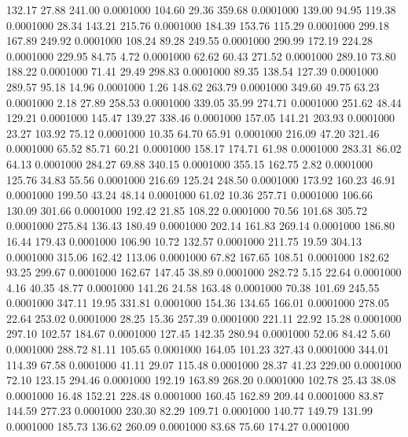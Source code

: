  132.17   27.88  241.00   0.0001000
 104.60   29.36  359.68   0.0001000
 139.00   94.95  119.38   0.0001000
  28.34  143.21  215.76   0.0001000
 184.39  153.76  115.29   0.0001000
 299.18  167.89  249.92   0.0001000
 108.24   89.28  249.55   0.0001000
 290.99  172.19  224.28   0.0001000
 229.95   84.75    4.72   0.0001000
  62.62   60.43  271.52   0.0001000
 289.10   73.80  188.22   0.0001000
  71.41   29.49  298.83   0.0001000
  89.35  138.54  127.39   0.0001000
 289.57   95.18   14.96   0.0001000
   1.26  148.62  263.79   0.0001000
 349.60   49.75   63.23   0.0001000
   2.18   27.89  258.53   0.0001000
 339.05   35.99  274.71   0.0001000
 251.62   48.44  129.21   0.0001000
 145.47  139.27  338.46   0.0001000
 157.05  141.21  203.93   0.0001000
  23.27  103.92   75.12   0.0001000
  10.35   64.70   65.91   0.0001000
 216.09   47.20  321.46   0.0001000
  65.52   85.71   60.21   0.0001000
 158.17  174.71   61.98   0.0001000
 283.31   86.02   64.13   0.0001000
 284.27   69.88  340.15   0.0001000
 355.15  162.75    2.82   0.0001000
 125.76   34.83   55.56   0.0001000
 216.69  125.24  248.50   0.0001000
 173.92  160.23   46.91   0.0001000
 199.50   43.24   48.14   0.0001000
  61.02   10.36  257.71   0.0001000
 106.66  130.09  301.66   0.0001000
 192.42   21.85  108.22   0.0001000
  70.56  101.68  305.72   0.0001000
 275.84  136.43  180.49   0.0001000
 202.14  161.83  269.14   0.0001000
 186.80   16.44  179.43   0.0001000
 106.90   10.72  132.57   0.0001000
 211.75   19.59  304.13   0.0001000
 315.06  162.42  113.06   0.0001000
  67.82  167.65  108.51   0.0001000
 182.62   93.25  299.67   0.0001000
 162.67  147.45   38.89   0.0001000
 282.72    5.15   22.64   0.0001000
   4.16   40.35   48.77   0.0001000
 141.26   24.58  163.48   0.0001000
  70.38  101.69  245.55   0.0001000
 347.11   19.95  331.81   0.0001000
 154.36  134.65  166.01   0.0001000
 278.05   22.64  253.02   0.0001000
  28.25   15.36  257.39   0.0001000
 221.11   22.92   15.28   0.0001000
 297.10  102.57  184.67   0.0001000
 127.45  142.35  280.94   0.0001000
  52.06   84.42    5.60   0.0001000
 288.72   81.11  105.65   0.0001000
 164.05  101.23  327.43   0.0001000
 344.01  114.39   67.58   0.0001000
  41.11   29.07  115.48   0.0001000
  28.37   41.23  229.00   0.0001000
  72.10  123.15  294.46   0.0001000
 192.19  163.89  268.20   0.0001000
 102.78   25.43   38.08   0.0001000
  16.48  152.21  228.48   0.0001000
 160.45  162.89  209.44   0.0001000
  83.87  144.59  277.23   0.0001000
 230.30   82.29  109.71   0.0001000
 140.77  149.79  131.99   0.0001000
 185.73  136.62  260.09   0.0001000
  83.68   75.60  174.27   0.0001000

